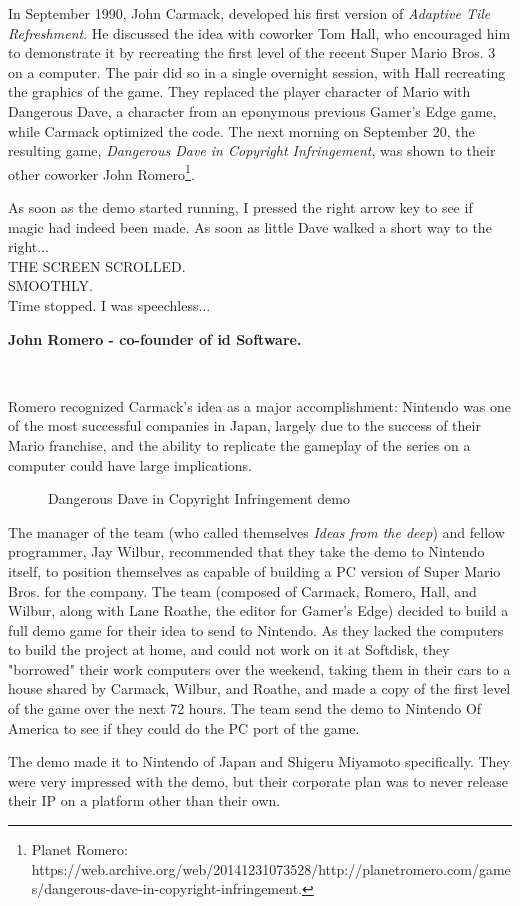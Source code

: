 \documentclass[book.tex]{subfiles}
\begin{document}
In September 1990, John Carmack, developed his first version of \textit{Adaptive Tile Refreshment}. He discussed the idea with coworker Tom Hall, who encouraged him to demonstrate it by recreating the first level of the recent Super Mario Bros. 3 on a computer. The pair did so in a single overnight session, with Hall recreating the graphics of the game. They replaced the player character of Mario with Dangerous Dave, a character from an eponymous previous Gamer's Edge game, while Carmack optimized the code. The next morning on September 20, the resulting game, \textit{Dangerous Dave in Copyright Infringement}, was shown to their other coworker John Romero\footnote{Planet Romero: https://web.archive.org/web/20141231073528/http://planetromero.com/games/dangerous-dave-in-copyright-infringement.}. \\

\par
\begin{fancyquotes}
As soon as the demo started running, I pressed the right arrow key to see if magic had indeed been made. As soon as little Dave walked a short way to the right...\\

THE SCREEN SCROLLED.\\

SMOOTHLY.\\

Time stopped. I was speechless...\\
\par
\textbf{John Romero - co-founder of id Software.}
\end{fancyquotes}\\


\par
Romero recognized Carmack's idea as a major accomplishment: Nintendo was one of the most successful companies in Japan, largely due to the success of their Mario franchise, and the ability to replicate the gameplay of the series on a computer could have large implications.\\

\begin{figure}[H]
\centering
 \caption{Dangerous Dave in Copyright Infringement demo}
 \label{fig:ddici}
\end{figure}

\par
The manager of the team (who called themselves \textit{Ideas from the deep}) and fellow programmer, Jay Wilbur, recommended that they take the demo to Nintendo itself, to position themselves as capable of building a PC version of Super Mario Bros. for the company. The team (composed of Carmack, Romero, Hall, and Wilbur, along with Lane Roathe, the editor for Gamer's Edge) decided to build a full demo game for their idea to send to Nintendo. As they lacked the computers to build the project at home, and could not work on it at Softdisk, they "borrowed" their work computers over the weekend, taking them in their cars to a house shared by Carmack, Wilbur, and Roathe, and made a copy of the first level of the game over the next 72 hours. The team send the demo to Nintendo Of America to see if they could do the PC port of the game. \\

\par
The demo made it to Nintendo of Japan and Shigeru Miyamoto specifically. They were very impressed with the demo, but their corporate plan was to never release their IP on a platform other than their own.\\
\end{document}
